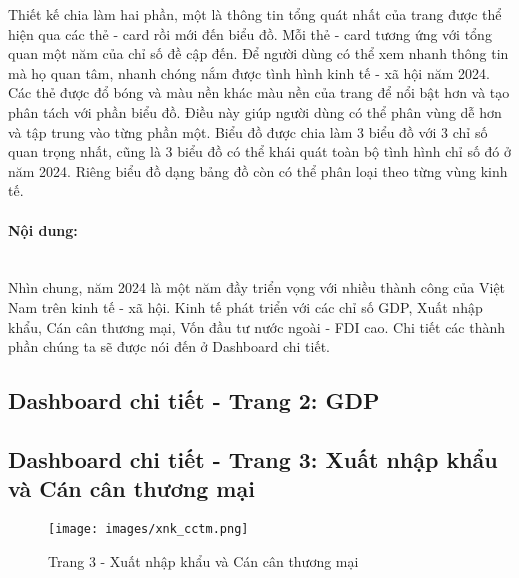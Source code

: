 \documentclass[a4paper]{report}
\begin{document}
{{Thiết kế chia làm hai phần, một là thông tin tổng quát nhất của trang được thể hiện qua các thẻ - card rồi mới đến biểu đồ. Mỗi thẻ - card tương ứng với tổng quan một năm của chỉ số đề cập đến.
Để người dùng có thể xem nhanh thông tin mà họ quan tâm, nhanh chóng nắm được tình hình kinh tế - xã hội năm 2024. Các thẻ được đổ bóng và màu nền khác màu nền của trang để nổi bật hơn và tạo phân tách với phần biểu đồ. Điều này giúp người dùng có thể phân vùng dễ hơn và tập trung vào từng phần một.
Biểu đồ được chia làm 3 biểu đồ với 3 chỉ số quan trọng nhất, cũng là 3 biểu đồ có thể khái quát toàn bộ tình hình chỉ số đó ở năm 2024. Riêng biểu đồ dạng bảng đồ còn có thể phân loại theo từng vùng kinh tế.\\

\paragraph{Nội dung:} \mbox{}\\

Nhìn chung, năm 2024 là một năm đầy triển vọng với nhiều thành công của Việt Nam trên kinh tế - xã hội. Kinh tế phát triển với các chỉ số GDP, Xuất nhập khẩu, Cán cân thương mại, Vốn đầu tư nước ngoài - FDI cao. Chi tiết các thành phần chúng ta sẽ được nói đến ở Dashboard chi tiết.\\

\newpage
\subsection{Dashboard chi tiết - Trang 2: GDP}


\newpage
\subsection{Dashboard chi tiết - Trang 3: Xuất nhập khẩu và Cán cân thương mại}


\begin{figure}[H]
    \centering
    \texttt{[image: images/xnk\_cctm.png]}
    \caption{Trang 3 - Xuất nhập khẩu và Cán cân thương mại}
    \label{fig:enter-label}
\end{figure}


}}
\end{document}
